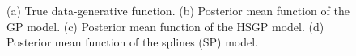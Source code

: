 \documentclass[]{interact}
\theoremstyle{plain}%
\theoremstyle{definition}
\theoremstyle{remark}
\begin{document}
\begin{figure}
\caption{(a) True data-generative function. (b) Posterior mean function of the GP model. (c) Posterior mean function of the HSGP model. (d) Posterior mean function of the splines (SP) model.}
  \label{fig15_Posteriors_exII}
\end{figure}
\end{document}
